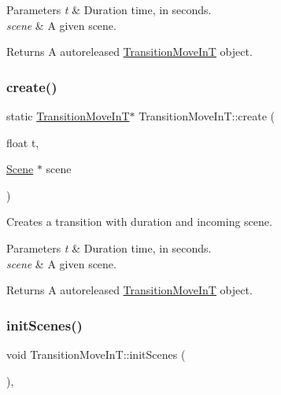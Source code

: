 \begin{DoxyParams}{Parameters}
{\em t} & Duration time, in seconds. \\
\hline
{\em scene} & A given scene. \\
\hline
\end{DoxyParams}
\begin{DoxyReturn}{Returns}
A autoreleased \hyperlink{classTransitionMoveInT}{Transition\+Move\+InT} object. 
\end{DoxyReturn}
\mbox{\label{classTransitionMoveInT_a5f8087bbe5841fcf1f0198bb293ca600}} 
\subsubsection{\texorpdfstring{create()}{create()}\hspace{0.1cm}{\footnotesize\ttfamily [2/2]}}
{\footnotesize\ttfamily static \hyperlink{classTransitionMoveInT}{Transition\+Move\+InT}$\ast$ Transition\+Move\+In\+T\+::create (\begin{DoxyParamCaption}\item[{float}]{t,  }\item[{\hyperlink{classScene}{Scene} $\ast$}]{scene }\end{DoxyParamCaption})\hspace{0.3cm}{\ttfamily [static]}}

Creates a transition with duration and incoming scene.


\begin{DoxyParams}{Parameters}
{\em t} & Duration time, in seconds. \\
\hline
{\em scene} & A given scene. \\
\hline
\end{DoxyParams}
\begin{DoxyReturn}{Returns}
A autoreleased \hyperlink{classTransitionMoveInT}{Transition\+Move\+InT} object. 
\end{DoxyReturn}
\mbox{\label{classTransitionMoveInT_a029a7a031fc78f3a1b46f734c7d429b6}} 
\subsubsection{\texorpdfstring{init\+Scenes()}{initScenes()}\hspace{0.1cm}{\footnotesize\ttfamily [1/2]}}
{\footnotesize\ttfamily void Transition\+Move\+In\+T\+::init\+Scenes (\begin{DoxyParamCaption}{ }\end{DoxyParamCaption})\hspace{0.3cm}{\ttfamily [protected]}, {\ttfamily [virtual]}}


